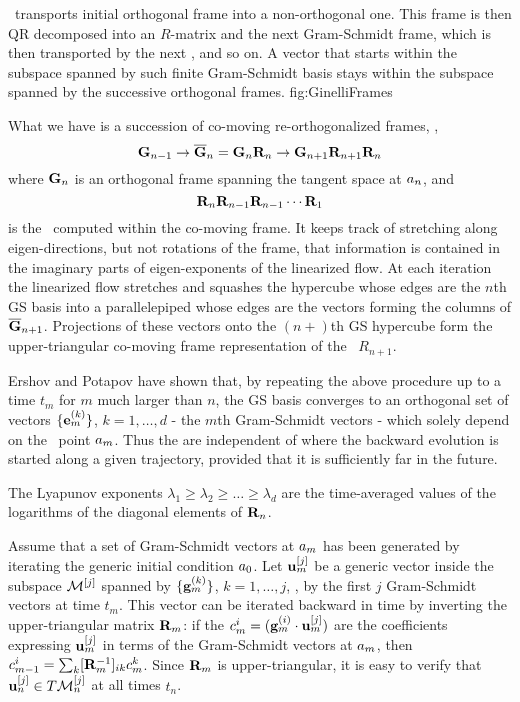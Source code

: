 %
 {}{ \JacobianM\ transports initial
orthogonal frame into a non-orthogonal one. This frame is then
QR decomposed into an $R$-matrix and the next Gram-Schmidt
frame, which is then transported by the next \jacobianM, and so
on. A vector that starts within the subspace spanned by such
finite Gram-Schmidt basis stays within the subspace spanned by
the successive orthogonal frames.
}{fig:GinelliFrames}
%

What we have is a succession of co-moving re-orthogonalized
frames, ,
\[
{\bf G}_{n-1} \to \overline{\bf G}_n =
 {\bf G}_n {\bf R}_n
 \to
{\bf G}_{n+1} {\bf R}_{n+1}{\bf R}_n
\]
where ${\bf G}_n$ is an orthogonal frame spanning the tangent
space at $a_n$, and
 \[
{\bf R}_n{\bf R}_{n-1} {\bf R}_{n-1}\cdots {\bf R}_1
 \]
 is the \jacobianM\ computed within the
co-moving frame. It keeps track of stretching along
eigen-directions, but not rotations of the frame, that
information is contained in the imaginary parts of
eigen-exponents of the linearized flow. At each iteration
the linearized flow stretches and squashes the hypercube
whose edges are the $n$th GS basis into a parallelepiped
whose edges are the vectors forming the columns of
$\overline{\bf G}_{n+1}$. Projections of these
vectors onto the $(n\!+\!)$th GS hypercube form
the upper-triangular co-moving frame representation
of the \jacobianM\ $R_{n+1}$.

Ershov and Potapov have shown that, by repeating
the above procedure up to a time $t_m$ for $m$ much larger than
$n$,  the GS basis converges to an orthogonal set of vectors
$\{{\bf e}_m^{(k)}\}$, $k=1,\ldots, d$ - the $m$th Gram-Schmidt
vectors - which solely depend on the \statesp\ point
$a_{m}$. Thus the {\cLvs} are independent
of where the backward evolution is started along a given
trajectory, provided that it is sufficiently far in the future.

The Lyapunov exponents $\lambda_1 \geq \lambda_2 \geq \ldots
\geq \lambda_d$ are the time-averaged values of the logarithms
of the diagonal elements of ${\bf R}_n$.

Assume that a set of Gram-Schmidt vectors at $a_m$ has been
generated by iterating the generic initial condition $a_0$.
Let ${\bf u}_m^{[j]}$ be a generic vector inside the subspace
$\mathcal{M}^{[j]}$ spanned by $\{{\bf g}_m^{(k)}\}$, $k=1,\ldots, j$,
\ie, by the first $j$ Gram-Schmidt vectors at time $t_m$. This
vector can be iterated backward in time by inverting the
upper-triangular matrix ${\bf R}_m$: if the $c_m^{i}=({\bf
g}_m^{(i)} \cdot {\bf u}_m^{[j]} )$ are the coefficients
expressing ${\bf u}_m^{[j]}$ in terms of the Gram-Schmidt
vectors at $a_m$, then $c_{m-1}^{i}= \sum_k [{\bf
R}_m^{-1}]_{ik} c_m^{k}$. Since ${\bf R}_m$ is
upper-triangular, it is easy to verify that ${\bf u}_n^{[j]}
\in T\mathcal{M}^{[j]}_n$ at all times $t_n$.


